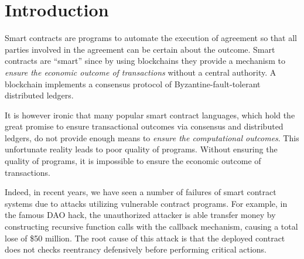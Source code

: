 \section{Introduction}
\label{sec:intro}





Smart contracts are programs to automate the execution of agreement so that all
parties involved in the agreement can be certain about the outcome.
Smart contracts are ``smart'' since by using blockchains they provide a
mechanism to \emph{ensure the economic outcome of transactions} without a
central authority.
A blockchain implements a consensus protocol of Byzantine-fault-tolerant
distributed ledgers.

It is however ironic that many popular smart contract languages, which hold the
great promise to ensure transactional outcomes via consensus and distributed
ledgers, do not provide enough means to \emph{ensure the computational outcomes}.
This unfortunate reality leads to poor quality of programs.
Without ensuring the quality of programs, it is impossible to ensure the
economic outcome of transactions.

Indeed, in recent years, we have seen a number of failures of smart contract
systems due to attacks utilizing vulnerable contract programs.
For example, in the famous DAO hack, the unauthorized attacker is
able transfer money by constructing recursive function calls with
the callback mechanism, causing a total lose of \$50 million.
The root cause of this attack is that the deployed contract does not
checks reentrancy defensively before performing critical actions.

